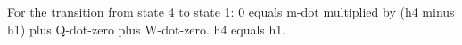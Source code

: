 For the transition from state 4 to state 1:  
0 equals m-dot multiplied by (h4 minus h1) plus Q-dot-zero plus W-dot-zero.  
h4 equals h1.